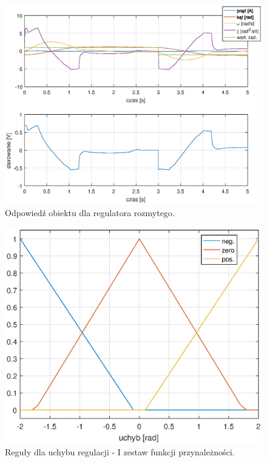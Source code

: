\begin{figure}[h!]
	\centering
	\includegraphics[scale = 0.8]{fig/fuzzy_odp.eps}
	\caption		
	{Odpowied\'z obiektu dla regulatora rozmytego.}
	\label{fuzzyOdp}
\end{figure}
	
\begin{figure}[h!]
	\centering
	\includegraphics[scale = 0.6]{fig/e_rules.eps}
	\caption		
	{Reguły dla uchybu regulacji - I zestaw funkcji przynależności.}
	\label{e_rules1}
\end{figure}


